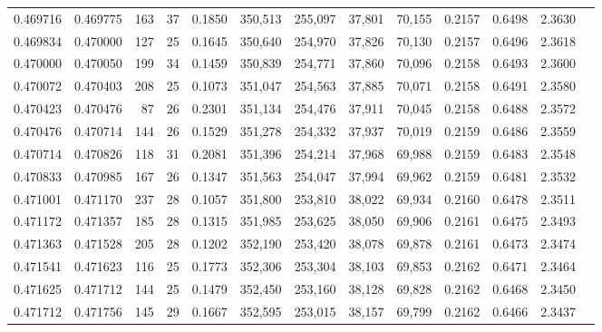 \begin{tabular}{rrrrrrrrrrrrr}
0.469716 & 0.469775 &    163 &    37 &                                     0.1850 & 350,513 & 255,097 &  37,801 &  70,155 & 0.2157 & 0.6498 & 2.3630 \\
0.469834 & 0.470000 &    127 &    25 &                                     0.1645 & 350,640 & 254,970 &  37,826 &  70,130 & 0.2157 & 0.6496 & 2.3618 \\
0.470000 & 0.470050 &    199 &    34 &                                     0.1459 & 350,839 & 254,771 &  37,860 &  70,096 & 0.2158 & 0.6493 & 2.3600 \\
0.470072 & 0.470403 &    208 &    25 &                                     0.1073 & 351,047 & 254,563 &  37,885 &  70,071 & 0.2158 & 0.6491 & 2.3580 \\
0.470423 & 0.470476 &     87 &    26 &                                     0.2301 & 351,134 & 254,476 &  37,911 &  70,045 & 0.2158 & 0.6488 & 2.3572 \\
0.470476 & 0.470714 &    144 &    26 &                                     0.1529 & 351,278 & 254,332 &  37,937 &  70,019 & 0.2159 & 0.6486 & 2.3559 \\
0.470714 & 0.470826 &    118 &    31 &                                     0.2081 & 351,396 & 254,214 &  37,968 &  69,988 & 0.2159 & 0.6483 & 2.3548 \\
0.470833 & 0.470985 &    167 &    26 &                                     0.1347 & 351,563 & 254,047 &  37,994 &  69,962 & 0.2159 & 0.6481 & 2.3532 \\
0.471001 & 0.471170 &    237 &    28 &                                     0.1057 & 351,800 & 253,810 &  38,022 &  69,934 & 0.2160 & 0.6478 & 2.3511 \\
0.471172 & 0.471357 &    185 &    28 &                                     0.1315 & 351,985 & 253,625 &  38,050 &  69,906 & 0.2161 & 0.6475 & 2.3493 \\
0.471363 & 0.471528 &    205 &    28 &                                     0.1202 & 352,190 & 253,420 &  38,078 &  69,878 & 0.2161 & 0.6473 & 2.3474 \\
0.471541 & 0.471623 &    116 &    25 &                                     0.1773 & 352,306 & 253,304 &  38,103 &  69,853 & 0.2162 & 0.6471 & 2.3464 \\
0.471625 & 0.471712 &    144 &    25 &                                     0.1479 & 352,450 & 253,160 &  38,128 &  69,828 & 0.2162 & 0.6468 & 2.3450 \\
0.471712 & 0.471756 &    145 &    29 &                                     0.1667 & 352,595 & 253,015 &  38,157 &  69,799 & 0.2162 & 0.6466 & 2.3437 \\

\end{tabular}
